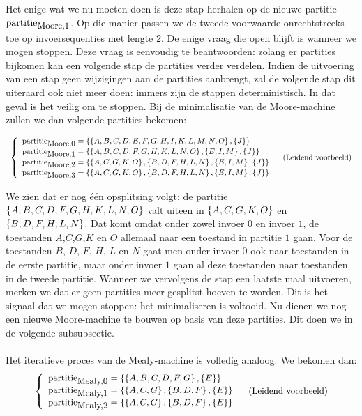 Het enige wat we nu moeten doen is deze stap herhalen op de nieuwe partitie $\mbox{partitie}_{\mbox{\small{Moore,1}}}$. Op die manier passen we de tweede voorwaarde onrechtstreeks toe op invoersequenties met lengte $2$. De enige vraag die open blijft is wanneer we mogen stoppen. Deze vraag is eenvoudig te beantwoorden: zolang er partities bijkomen kan een volgende stap de partities verder verdelen. Indien de uitvoering van een stap geen wijzigingen aan de partities aanbrengt, zal de volgende stap dit uiteraard ook niet meer doen: immers zijn de stappen deterministisch. In dat geval is het veilig om te stoppen. Bij de minimalisatie van de Moore-machine zullen we dan volgende partities bekomen:

\begin{equation}
\small{
\begin{array}{lr}
\ensuremath{\left\{\begin{array}{ll} 
\mbox{partitie}_{\mbox{\small{Moore,0}}}=\left\{ \left\{ A,B,C,D,E,F,G,H,I,K,L,M,N,O \right\},\left\{ J \right\} \right\}\\
\mbox{partitie}_{\mbox{\small{Moore,1}}}=\left\{ \left\{ A,B,C,D,F,G,H,K,L,N,O \right\},\left\{ E,I,M \right\},\left\{ J \right\} \right\}\\
\mbox{partitie}_{\mbox{\small{Moore,2}}}=\left\{ \left\{ A,C,G,K,O \right\},\left\{ B,D,F,H,L,N \right\},\left\{ E,I,M \right\},\left\{ J \right\} \right\}\\
\mbox{partitie}_{\mbox{\small{Moore,3}}}=\left\{ \left\{ A,C,G,K,O \right\},\left\{ B,D,F,H,L,N \right\},\left\{ E,I,M \right\},\left\{ J \right\} \right\}
 \end{array}\right.}&\mbox{(Leidend voorbeeld)}
\end{array}}
\end{equation}

We zien dat er nog \'e\'en opsplitsing volgt: de partitie $\left\{ A,B,C,D,F,G,H,K,L,N,O \right\}$ valt uiteen in $\left\{ A,C,G,K,O \right\}$ en $\left\{ B,D,F,H,L,N \right\}$. Dat komt omdat onder zowel invoer $0$ en invoer $1$, de toestanden $A$,$C$,$G$,$K$ en $O$ allemaal naar een toestand in partitie $1$ gaan. Voor de toestanden $B$, $D$, $F$, $H$, $L$ en $N$ gaat men onder invoer $0$ ook naar toestanden in de eerste partitie, maar onder invoer $1$ gaan al deze toestanden naar toestanden in de tweede partitie. Wanneer we vervolgens de stap een laatste maal uitvoeren, merken we dat er geen partities meer gesplitst hoeven te worden. Dit is het signaal dat we mogen stoppen: het minimaliseren is voltooid. Nu dienen we nog een nieuwe Moore-machine te bouwen op basis van deze partities. Dit doen we in de volgende subsubsectie.

\paragraph{}
Het iteratieve proces van de Mealy-machine is volledig analoog. We bekomen dan:
\begin{equation}
\small{
\begin{array}{lr}
\ensuremath{\left\{\begin{array}{ll} 
\mbox{partitie}_{\mbox{\small{Mealy,0}}}=\left\{ \left\{ A,B,C,D,F,G \right\},\left\{ E \right\} \right\}\\
\mbox{partitie}_{\mbox{\small{Mealy,1}}}=\left\{ \left\{ A,C,G \right\},\left\{ B,D,F \right\},\left\{ E \right\} \right\}\\
\mbox{partitie}_{\mbox{\small{Mealy,2}}}=\left\{ \left\{ A,C,G \right\},\left\{ B,D,F \right\},\left\{ E \right\} \right\}
 \end{array}\right.}&\mbox{(Leidend voorbeeld)}
\end{array}}
\end{equation}

